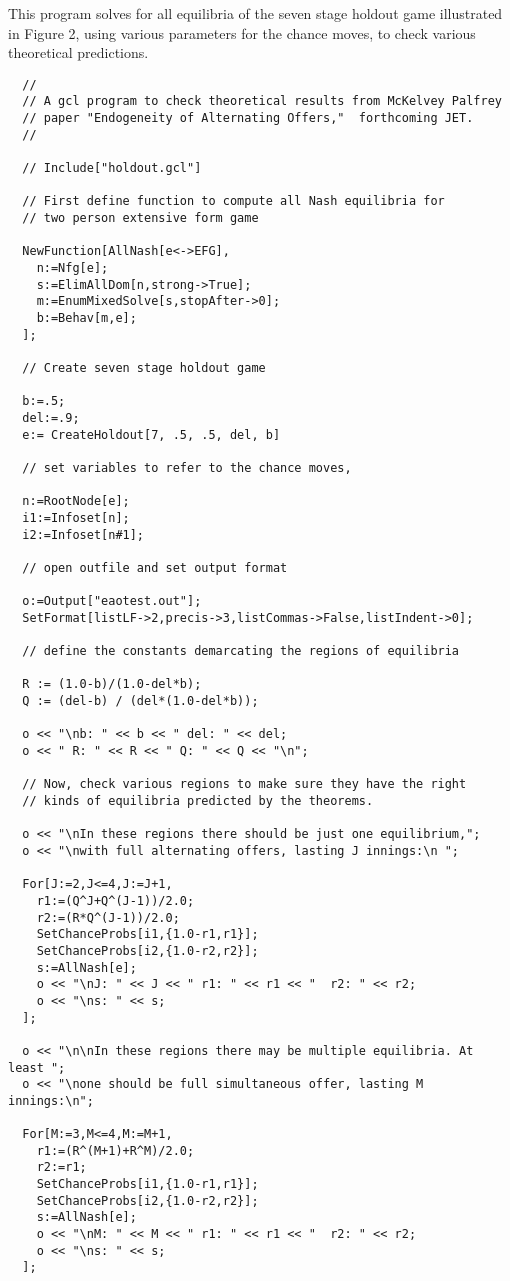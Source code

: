 \newpage
\noindent
This program solves for all equilibria of the seven stage holdout game
illustrated in Figure 2, using various parameters for the chance
moves, to check various theoretical predictions. 
\begin{verbatim}
  //
  // A gcl program to check theoretical results from McKelvey Palfrey 
  // paper "Endogeneity of Alternating Offers,"  forthcoming JET.  
  //

  // Include["holdout.gcl"]

  // First define function to compute all Nash equilibria for 
  // two person extensive form game

  NewFunction[AllNash[e<->EFG],
    n:=Nfg[e];
    s:=ElimAllDom[n,strong->True];
    m:=EnumMixedSolve[s,stopAfter->0];
    b:=Behav[m,e];
  ];

  // Create seven stage holdout game

  b:=.5;
  del:=.9;
  e:= CreateHoldout[7, .5, .5, del, b]

  // set variables to refer to the chance moves, 

  n:=RootNode[e];
  i1:=Infoset[n];
  i2:=Infoset[n#1];

  // open outfile and set output format

  o:=Output["eaotest.out"];
  SetFormat[listLF->2,precis->3,listCommas->False,listIndent->0];

  // define the constants demarcating the regions of equilibria

  R := (1.0-b)/(1.0-del*b);
  Q := (del-b) / (del*(1.0-del*b));

  o << "\nb: " << b << " del: " << del;
  o << " R: " << R << " Q: " << Q << "\n";

  // Now, check various regions to make sure they have the right 
  // kinds of equilibria predicted by the theorems.  

  o << "\nIn these regions there should be just one equilibrium,";
  o << "\nwith full alternating offers, lasting J innings:\n ";

  For[J:=2,J<=4,J:=J+1,
    r1:=(Q^J+Q^(J-1))/2.0;
    r2:=(R*Q^(J-1))/2.0;
    SetChanceProbs[i1,{1.0-r1,r1}];
    SetChanceProbs[i2,{1.0-r2,r2}];
    s:=AllNash[e];
    o << "\nJ: " << J << " r1: " << r1 << "  r2: " << r2;
    o << "\ns: " << s;
  ];

  o << "\n\nIn these regions there may be multiple equilibria. At least ";
  o << "\none should be full simultaneous offer, lasting M innings:\n";

  For[M:=3,M<=4,M:=M+1,
    r1:=(R^(M+1)+R^M)/2.0;
    r2:=r1;
    SetChanceProbs[i1,{1.0-r1,r1}];
    SetChanceProbs[i2,{1.0-r2,r2}];
    s:=AllNash[e];
    o << "\nM: " << M << " r1: " << r1 << "  r2: " << r2;
    o << "\ns: " << s;
  ];
\end{verbatim}

